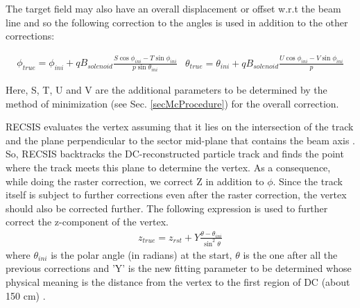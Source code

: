 
The target field may also have an overall displacement or offset w.r.t the beam line and so the following correction to
the angles is used in addition to the other corrections:

\begin{subequations}
\label{eqOffsetCor}
\begin{eqnarray}
\label{eqOffsetCor1}
\phi_{true} = \phi_{ini} + qB_{solenoid}\frac{S \cos\phi_{ini} - T \sin\phi_{ini}}{p \sin\theta_{ini}}
\end{eqnarray}

\begin{eqnarray}
\label{eqOffsetCor2}
\theta_{true} = \theta_{ini} + qB_{solenoid} \frac{U \cos\phi_{ini} - V \sin\phi_{ini}}{p}
\end{eqnarray}
\end{subequations}

Here, S, T, U and V are the additional parameters to be determined by the method of \chisqs minimization (see Sec. \ref{secMcProcedure}) for the overall correction.









RECSIS evaluates the vertex assuming that it lies on the intersection of the track and the plane perpendicular to the 
sector mid-plane that contains the beam axis \cite{kuhnDvcs_wb}. So, RECSIS backtracks the DC-reconstructed particle track and finds the point where
the track meets this plane %
to determine the vertex. As a consequence, %
while doing the raster correction, we correct %
Z in addition to  $\phi$. Since the track itself is subject to further corrections even after the raster correction,
the vertex should also be corrected further. The following expression is used to further correct the z-component of the vertex.
\begin{eqnarray}
\label{eqExVzCor}
z_{true} = z_{rst} + Y \frac{\theta - \theta_{ini}}{\sin^2\theta}
\end{eqnarray}
where $\theta_{ini}$ is the polar angle (in radians) at the start, $\theta$ is the one after all the previous corrections and 'Y' is the new fitting parameter to be determined whose physical meaning is the distance from the vertex to the first region of DC (about 150 cm) \cite{slava_th}.


















